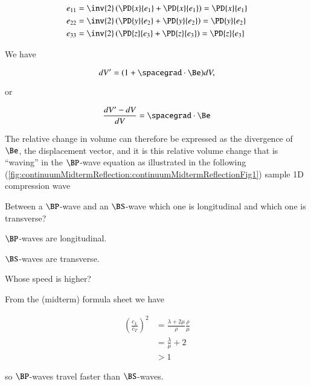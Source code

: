 \begin{Answer}[ref={problem:elastic:displacements:midtermQ1a}]
\begin{align}\label{eqn:continuumMidTermReflection:90}
e_{11} &= \inv{2} \left( \PD{x}{e_1} +\PD{x}{e_1} \right) = \PD{x}{e_1} \\
e_{22} &= \inv{2} \left( \PD{y}{e_2} +\PD{y}{e_2} \right) = \PD{y}{e_2} \\
e_{33} &= \inv{2} \left( \PD{z}{e_3} +\PD{z}{e_3} \right) = \PD{z}{e_3}
\end{align}

We have

\begin{equation}\label{eqn:continuumMidTermReflection:110}
dV' = (1 + \spacegrad \cdot \Be) dV,
\end{equation}

or

\begin{equation}\label{eqn:continuumMidTermReflection:130}
\frac{dV' - dV}{dV} = \spacegrad \cdot \Be
\end{equation}

The relative change in volume can therefore be expressed as the divergence of $\Be$, the displacement vector, and it is this relative volume change that is ``waving'' in the $\BP$-wave equation as illustrated in the following (\ref{fig:continuumMidtermReflection:continuumMidtermReflectionFig1}) sample 1D compression wave

\end{Answer}

\begin{Exercise}[title={Classify $\BP$-waves and $\BS$-waves as longitudinal or transverse}, label={problem:elastic:displacements:midtermQ1b}]
Between a $\BP$-wave and an $\BS$-wave which one is longitudinal and which one is transverse?
\end{Exercise}

\begin{Answer}[ref={problem:elastic:displacements:midtermQ1b}]
$\BP$-waves are longitudinal.

$\BS$-waves are transverse.
\end{Answer}

\begin{Exercise}[title={Speed of $\BP$-waves and $\BS$-waves}, label={problem:elastic:displacements:midtermQ1c}]
Whose speed is higher?
\end{Exercise}

\begin{Answer}[ref={problem:elastic:displacements:midtermQ1c}]
From the (midterm) formula sheet we have

\begin{align*}
\left( \frac{c_L}{c_T} \right)^2 
&= \frac{ \lambda + 2 \mu}{\rho} \frac{\rho}{\mu}  \\
&= \frac{\lambda}{\mu} + 2  \\
&> 1
\end{align*}

so $\BP$-waves travel faster than $\BS$-waves.
\end{Answer}

